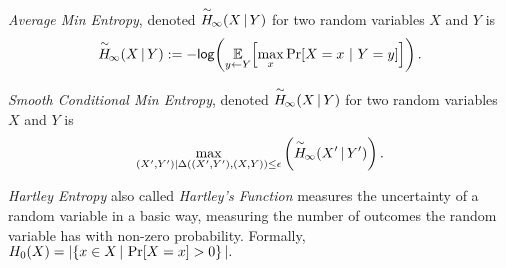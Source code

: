 \begin{definition}
    \emph{Average Min Entropy}, denoted $\overset{\sim}{H}\!_{\infty}\!\left(X\,|\,Y\right)$ for two random variables $X$ and $Y$ is \[ \overset{\sim}{H}\!_{\infty}\!\left(X\,|\,Y\right) := -\mathsf{log}\!\left(\operatorname*{\mathbb{E}}\limits_{y \leftarrow Y}\!\left[\max\limits_{x} \Pr\!\left[X = x\ |\ Y = y\right]\right]\right).\] 
\end{definition}

\begin{definition}
    \emph{Smooth Conditional Min Entropy}, denoted $\overset{\sim}{H}\!_{\infty}\!\left(X\,|\,Y\right)$ for two random variables $X$ and $Y$ is \[\max_{(X', Y') | \Delta((X', Y'), (X, Y))\le \epsilon} \left( \overset{\sim}{H}\!_{\infty}\!\left(X'\,|\,Y'\right)\right).
    \] 
\end{definition}


\begin{definition}
    \emph{Hartley Entropy} also called \emph{Hartley's Function} measures the uncertainty of a random variable in a basic way, measuring the number of outcomes the random variable has with non-zero probability. Formally, $
    H_0\!\left(X\right) = | \!\left\{ x \in X\,|\, \Pr\!\left[X = x\right] > 0 \right\}|.
    $
\end{definition}


